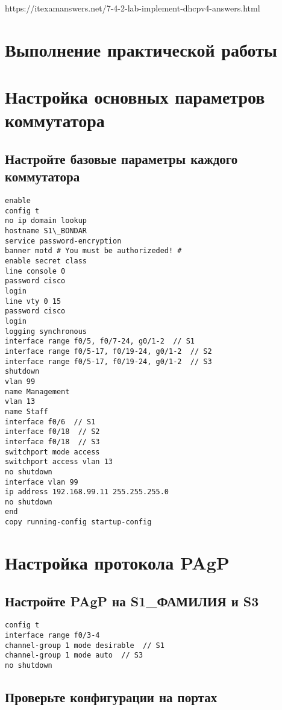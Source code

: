https://itexamanswers.net/7-4-2-lab-implement-dhcpv4-answers.html

\section{Выполнение практической работы}

\section{Настройка основных параметров коммутатора}

\subsection{Настройте базовые параметры каждого коммутатора}

\begin{verbatim}
enable
config t
no ip domain lookup
hostname S1\_BONDAR
service password-encryption
banner motd # You must be authorizeded! #
enable secret class
line console 0
password cisco
login
line vty 0 15
password cisco
login
logging synchronous
interface range f0/5, f0/7-24, g0/1-2  // S1
interface range f0/5-17, f0/19-24, g0/1-2  // S2
interface range f0/5-17, f0/19-24, g0/1-2  // S3
shutdown
vlan 99
name Management
vlan 13
name Staff
interface f0/6  // S1
interface f0/18  // S2
interface f0/18  // S3
switchport mode access
switchport access vlan 13
no shutdown
interface vlan 99
ip address 192.168.99.11 255.255.255.0
no shutdown
end
copy running-config startup-config
\end{verbatim}

\section{Настройка протокола PAgP}
\subsection{Настройте PAgP на S1\_ФАМИЛИЯ и S3}

\begin{verbatim}
config t
interface range f0/3-4
channel-group 1 mode desirable  // S1
channel-group 1 mode auto  // S3
no shutdown
\end{verbatim}

\subsection{Проверьте конфигурации на портах}

